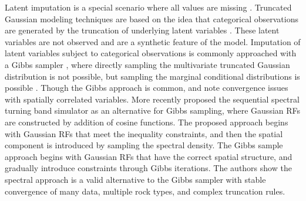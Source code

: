Latent imputation is a special scenario where all values are missing \citep{little2019statistical}. Truncated Gaussian modeling techniques are based on the idea that categorical observations are generated by the truncation of underlying latent variables \citep{matheron1987conditional}. These latent variables are not observed and are a synthetic feature of the model. Imputation of latent variables subject to categorical observations is commonly approached with a Gibbs sampler \citep{geman1984stochastic}, where directly sampling the multivariate truncated Gaussian distribution is not possible, but sampling the marginal conditional distributions is possible \citep{silva2018enhanced,arroyo2020iterative,madani2021enhanced}. Though the Gibbs approach is common, \cite{emery2014simulating} and \cite{silva2018enhanced} note convergence issues with spatially correlated variables. More recently \cite{lauzon2020calibration,lauzon2020sequential,lauzon2023joint} proposed the sequential spectral turning band simulator as an alternative for Gibbs sampling, where Gaussian \glspl{RF} are constructed by addition of cosine functions. The proposed approach begins with Gaussian \glspl{RF} that meet the inequality constraints, and then the spatial component is introduced by sampling the spectral density. The Gibbs sample approach begins with Gaussian \glspl{RF} that have the correct spatial structure, and gradually introduce constraints through Gibbs iterations. The authors show the spectral approach is a valid alternative to the Gibbs sampler with stable convergence of many data, multiple rock types, and complex truncation rules.






